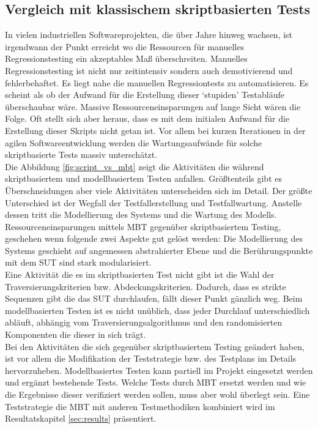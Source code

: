 \subsection{Vergleich mit klassischem skriptbasierten Tests}
In vielen industriellen Softwareprojekten, die über Jahre hinweg wachsen, ist irgendwann der Punkt erreicht wo die Ressourcen für manuelles Regressionstesting ein akzeptables Maß überschreiten. Manuelles Regressionstesting ist nicht nur zeitintensiv sondern auch demotivierend und fehlerbehaftet. Es liegt nahe die manuellen Regressiontests zu automatisieren. Es scheint als ob der Aufwand für die Erstellung dieser `stupiden' Testabläufe überschaubar wäre. Massive Ressourceneinsparungen auf lange Sicht wären die Folge. Oft stellt sich aber heraus, dass es mit dem initialen Aufwand für die Erstellung dieser Skripts nicht getan ist. Vor allem bei kurzen Iterationen in der agilen Softwareentwicklung werden die Wartungsaufwände für solche skriptbasierte Tests massiv unterschätzt.\\
Die Abbildung \ref{fig:script_vs_mbt} zeigt die Aktivitäten die während skriptbasiertem und modellbasiertem Testen anfallen. Größtenteils gibt es Überschneidungen aber viele Aktivitäten unterscheiden sich im Detail. Der größte Unterschied ist der Wegfall der Testfallerstellung und Testfallwartung. Anstelle dessen tritt die Modellierung des Systems und die Wartung des Modells. Ressourceneinsparungen mittels MBT gegenüber skriptbasiertem Testing, geschehen wenn folgende zwei Aspekte gut gelöst werden: Die Modellierung des Systems geschieht auf angemessen abstrahierter Ebene und die Berührungspunkte mit dem SUT sind stark modularisiert\cite{utting_practical_2007}.\\
Eine Aktivität die es im skriptbasierten Test nicht gibt ist die Wahl der Traversierungskriterien bzw. Abdeckungskriterien. Dadurch, dass es strikte Sequenzen gibt die das SUT durchlaufen, fällt dieser Punkt gänzlich weg. Beim modellbasierten Testen ist es nicht unüblich, dass jeder Durchlauf unterschiedlich abläuft, abhängig vom Traversierungsalgorithmus und den randomisierten Komponenten die dieser in sich trägt.\\
Bei den Aktivitäten die sich gegenüber skriptbasiertem Testing geändert haben, ist vor allem die Modifikation der Teststrategie bzw. des Testplans im Details hervorzuheben. Modellbasiertes Testen kann partiell im Projekt eingesetzt werden und ergänzt bestehende Tests. Welche Tests durch MBT ersetzt werden und wie die Ergebnisse dieser verifiziert werden sollen, muss aber wohl überlegt sein. Eine Teststrategie die MBT mit anderen Testmethodiken kombiniert wird im Resultatskapitel \ref{sec:results} präsentiert.

